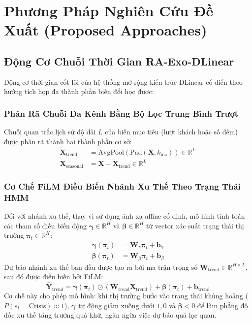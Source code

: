 \section{Phương Pháp Nghiên Cứu Đề Xuất (Proposed Approaches)}
\label{sec:proposed_approaches}

\subsection{Động Cơ Chuỗi Thời Gian RA-Exo-DLinear}
\label{subsec:ra_exo_dlinear}
Động cơ thời gian cốt lõi của hệ thống mở rộng kiến trúc DLinear cổ điển theo hướng tích hợp đa thành phần biến đổi học được:

\subsubsection{Phân Rã Chuỗi Đa Kênh Bằng Bộ Lọc Trung Bình Trượt}
Chuỗi quan trắc lịch sử độ dài $L$ của biến mục tiêu (lượt khách hoặc số đêm) được phân rã thành hai thành phần cơ sở:
\begin{align}
    \mathbf{X}_{\text{trend}} &= \text{AvgPool}(\text{Pad}(\mathbf{X}, k_{\text{ma}})) \in \mathbb{R}^{L} \\
    \mathbf{X}_{\text{seasonal}} &= \mathbf{X} - \mathbf{X}_{\text{trend}} \in \mathbb{R}^{L}
\end{align}

\subsubsection{Cơ Chế FiLM Điều Biến Nhánh Xu Thế Theo Trạng Thái HMM}
Đối với nhánh xu thế, thay vì sử dụng ánh xạ affine cố định, mô hình tính toán các tham số điều biến động $\bm{\gamma} \in \mathbb{R}^H$ và $\bm{\beta} \in \mathbb{R}^H$ từ vector xác suất trạng thái thị trường $\bm{\pi}_t \in \mathbb{R}^K$:
\begin{align}
    \bm{\gamma}(\bm{\pi}_t) &= \mathbf{W}_{\gamma} \bm{\pi}_t + \mathbf{b}_{\gamma} \\
    \bm{\beta}(\bm{\pi}_t)  &= \mathbf{W}_{\beta} \bm{\pi}_t + \mathbf{b}_{\beta}
\end{align}
Dự báo nhánh xu thế ban đầu được tạo ra bởi ma trận trọng số $\mathbf{W}_{\text{trend}} \in \mathbb{R}^{H \times L}$, sau đó được điều biến bởi FiLM:
\begin{equation}
    \hat{\mathbf{Y}}_{\text{trend}} = \bm{\gamma}(\bm{\pi}_t) \odot \left( \mathbf{W}_{\text{trend}} \mathbf{X}_{\text{trend}} \right) + \bm{\beta}(\bm{\pi}_t) + \mathbf{b}_{\text{trend}}
\end{equation}
Cơ chế này cho phép mô hình: khi thị trường bước vào trạng thái khủng hoảng ($P(s_t = \text{Crisis}) \approx 1$), $\bm{\gamma}$ tự động giảm xuống dưới $1{,}0$ và $\bm{\beta} < 0$ để làm phẳng độ dốc xu thế tăng trưởng quá khứ, ngăn ngừa việc dự báo quá lạc quan.

